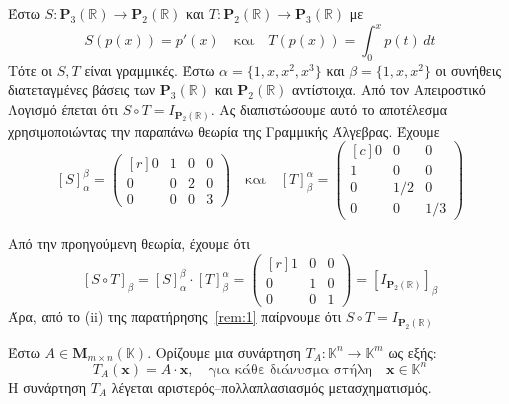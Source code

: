 \begin{example}
  Έστω $ S \colon \textbf{P}_{3}(\mathbb{R}) \to \textbf{P}_{2}(\mathbb{R}) $ 
  και $ T \colon \textbf{P}_{2}(\mathbb{R}) \to \textbf{P}_{3}(\mathbb{R}) $ 
  με 
  \[
    S(p(x)) = p'(x) \quad \text{και} \quad T(p(x)) = \int_{0}^{x} p(t) \,{dt} 
  \] 
  Τότε οι $ S,T $ είναι γραμμικές. Έστω $ \alpha = \{ 1,x,x^{2},x^{3} \} $ και 
  $ \beta = \{ 1,x,x^{2} \} $ οι συνήθεις διατεταγμένες βάσεις των $
  \textbf{P}_{3}(\mathbb{R}) $ και $ \textbf{P}_{2}(\mathbb{R}) $ αντίστοιχα.
  Από τον Απειροστικό Λογισμό έπεται ότι $ S \circ T = I_{\textbf{P}_{2}(\mathbb{R})}$. 
  Ας διαπιστώσουμε αυτό το αποτέλεσμα χρησιμοποιώντας την παραπάνω θεωρία της Γραμμικής
  Άλγεβρας. Έχουμε
  \[
    [S]_{\alpha}^{\beta} = 
    \begin{pmatrix*}[r]
      0 & 1 & 0 & 0 \\
      0 & 0 & 2 & 0 \\
      0 & 0 & 0 & 3
    \end{pmatrix*} \quad \text{και} \quad [T]_{\beta}^{\alpha} = 
    \begin{pmatrix*}[c]
      0 & 0 & 0 \\
      1 & 0 & 0 \\
      0 & 1/2 & 0 \\
      0 & 0 & 1/3
    \end{pmatrix*}
  \] 
\end{example}
Από την προηγούμενη θεωρία, έχουμε ότι 
\[
  [S \circ T]_{\beta} = [S]_{\alpha}^{\beta} \cdot [T]_{\beta}^{\alpha} = 
  \begin{pmatrix*}[r]
    1 & 0 & 0 \\
    0 & 1 & 0 \\
    0 & 0 & 1
  \end{pmatrix*} = [I_{\textbf{P}_{2}(\mathbb{R})}]_{\beta}
\]
Άρα, από το (ii) της παρατήρησης~\ref{rem:1} παίρνουμε ότι 
$
S \circ T = I_{\textbf{P}_{2}(\mathbb{R})} 
$

\begin{dfn}
  Έστω $ A \in \textbf{M}_{m \times n}(\mathbb{K})  $. Ορίζουμε μια συνάρτηση 
  $ T_{A} \colon \mathbb{K}^{n} \to \mathbb{K}^{m} $ ως εξής:
  \[
    T_{A}(\mathbf{x}) = A \cdot \mathbf{x}, \quad \text{για κάθε διάνυσμα στήλη} 
    \quad  \mathbf{x} \in \mathbb{K}^{n}  
  \] 
  Η συνάρτηση $ T_{A} $ λέγεται \textcolor{Col1}{αριστερός--πολλαπλασιασμός
  μετασχηματισμός}.
\end{dfn}

